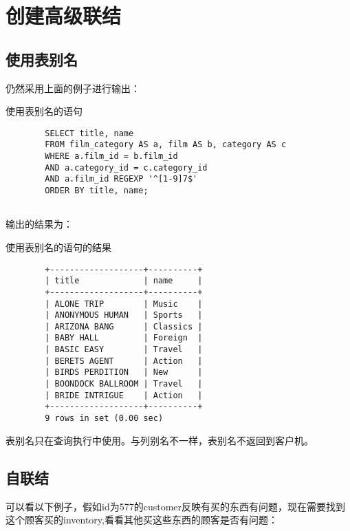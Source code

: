 \documentclass[UTF8]{article}
\begin{document}
\section{创建高级联结}
\subsection{使用表别名}

仍然采用上面的例子进行输出：

\begin{listing}[H]
        \caption{使用表别名的语句}
	\label{code:usetableasclause}
\begin{verbatim}
        SELECT title, name 
        FROM film_category AS a, film AS b, category AS c
        WHERE a.film_id = b.film_id 
        AND a.category_id = c.category_id 
        AND a.film_id REGEXP '^[1-9]7$' 
        ORDER BY title, name;
        
\end{verbatim}
\end{listing}

输出的结果为：

\begin{listing}[H]
	\caption{使用表别名的语句的结果}
	\label{code:usetableasclauseresult}
\begin{verbatim}
        +-------------------+----------+
        | title             | name     |
        +-------------------+----------+
        | ALONE TRIP        | Music    |
        | ANONYMOUS HUMAN   | Sports   |
        | ARIZONA BANG      | Classics |
        | BABY HALL         | Foreign  |
        | BASIC EASY        | Travel   |
        | BERETS AGENT      | Action   |
        | BIRDS PERDITION   | New      |
        | BOONDOCK BALLROOM | Travel   |
        | BRIDE INTRIGUE    | Action   |
        +-------------------+----------+
        9 rows in set (0.00 sec)
\end{verbatim}
\end{listing}

\begin{orangebox}[frametitle={Tips 16.1.1 注意表别名}]
        表别名只在查询执行中使用。与列别名不一样，表别名不返回到客户机。
\end{orangebox}   

\subsection{自联结}

可以看以下例子，假如id为577的customer反映有买的东西有问题，现在需要找到这个顾客买的inventory,看看其他买这些东西的顾客是否有问题：
\end{document}
